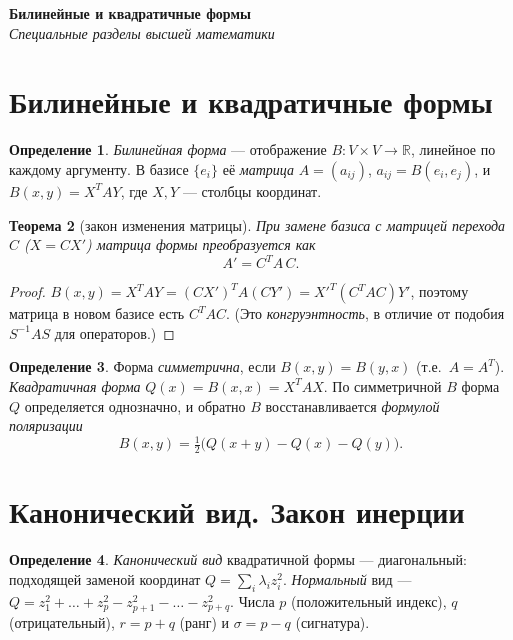 \documentclass[11pt,a4paper]{article}
\newcommand{\coursename}{Специальные разделы высшей математики}
\newcommand{\doctitle}{Билинейные и квадратичные формы}
\theoremstyle{definition}
\newtheorem{definition}{Определение}[section]
\theoremstyle{plain}
\newtheorem{theorem}[definition]{Теорема}
\newcommand{\R}{\mathbb{R}}
\begin{document}
\begin{center}
  {\LARGE\bfseries \doctitle}\\[4pt]
  {\large\itshape \coursename}
\end{center}
\vspace{6pt}

\section{Билинейные и квадратичные формы}

\begin{definition}
\emph{Билинейная форма} — отображение $B\colon V\times V\to\R$, линейное по каждому аргументу. В
базисе $\{e_i\}$ её \emph{матрица} $A=(a_{ij})$, $a_{ij}=B(e_i,e_j)$, и
$B(x,y)=X^{T}AY$, где $X,Y$ — столбцы координат.
\end{definition}

\begin{theorem}[закон изменения матрицы]
При замене базиса с матрицей перехода $C$ ($X=CX'$) матрица формы преобразуется как
\[
  A'=C^{T}A\,C .
\]
\end{theorem}

\begin{proof}
$B(x,y)=X^{T}AY=(CX')^{T}A(CY')=X'^{T}(C^{T}AC)Y'$, поэтому матрица в новом базисе есть $C^TAC$.
(Это \emph{конгруэнтность}, в отличие от подобия $S^{-1}AS$ для операторов.)
\end{proof}

\begin{definition}
Форма \emph{симметрична}, если $B(x,y)=B(y,x)$ (т.е.\ $A=A^{T}$). \emph{Квадратичная форма}
$Q(x)=B(x,x)=X^{T}AX$. По симметричной $B$ форма $Q$ определяется однозначно, и обратно $B$
восстанавливается \emph{формулой поляризации}
\[
  B(x,y)=\tfrac12\bigl(Q(x+y)-Q(x)-Q(y)\bigr).
\]
\end{definition}

\section{Канонический вид. Закон инерции}

\begin{definition}
\emph{Канонический вид} квадратичной формы — диагональный: подходящей заменой координат
$Q=\sum_i \lambda_i z_i^2$. \emph{Нормальный} вид —
$Q=z_1^2+\dots+z_p^2-z_{p+1}^2-\dots-z_{p+q}^2$. Числа $p$ (положительный индекс), $q$
(отрицательный), $r=p+q$ (ранг) и $\sigma=p-q$ (сигнатура).
\end{definition}
\end{document}
